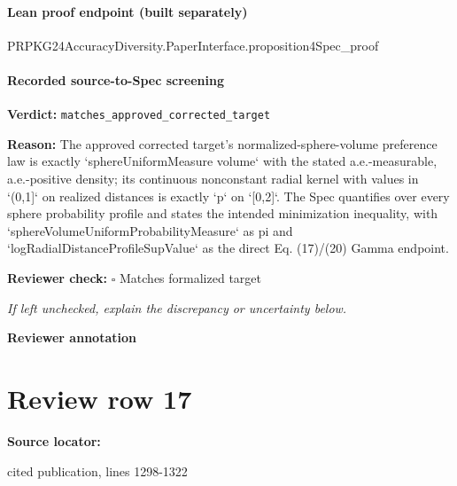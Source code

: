 \documentclass[10pt]{article}
\newcommand{\reviewerbox}{%
  \par\noindent\fbox{\parbox{0.96\linewidth}{\rule{0pt}{0.38in}}}\par
}
\newcommand{\reviewmatch}[1]{%
  \par\noindent\textbf{Reviewer check:} $\square$\; #1\par
  \noindent\emph{If left unchecked, explain the discrepancy or uncertainty below.}\par
}
\begin{document}
\paragraph{Lean proof endpoint (built separately)}\begin{ReviewVerbatim}
PRPKG24AccuracyDiversity.PaperInterface.proposition4Spec_proof
\end{ReviewVerbatim}

\paragraph{Recorded source-to-Spec screening}
\textbf{Verdict:} \texttt{matches\_approved\_corrected\_target}
\\
{\raggedright
\textbf{Reason:} The approved corrected target's normalized-\allowbreak{}sphere-\allowbreak{}volume preference law is exactly `sphereUniformMeasure volume` with the stated a.\allowbreak{}e.\allowbreak{}-\allowbreak{}measurable, a.\allowbreak{}e.\allowbreak{}-\allowbreak{}positive density;\allowbreak{} its continuous nonconstant radial kernel with values in `(0,1]` on realized distances is exactly `p` on `[0,2]`.\allowbreak{} The Spec quantifies over every sphere probability profile and states the intended minimization inequality, with `sphereVolumeUniformProbabilityMeasure` as pi and `logRadialDistanceProfileSupValue` as the direct Eq.\allowbreak{} (17)/\allowbreak{}(20) Gamma endpoint.\allowbreak{}
\par}
\reviewmatch{Matches formalized target}
\noindent\textbf{Reviewer annotation}\par
\reviewerbox
\clearpage
\hypertarget{source-claim-fa631b15a4a1176a}{}
\section*{Review row 17}
\textbf{Source locator:} {\footnotesize\raggedright cited publication, lines 1298-\allowbreak{}1322\par}
\end{document}

